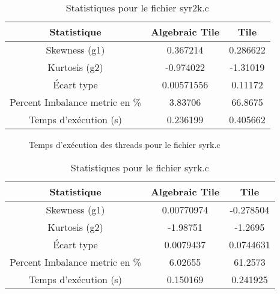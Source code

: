 \documentclass{article}
\begin{document}
\begin{table}[htbp]
  \centering
  \caption{Statistiques pour le fichier syr2k.c}
  \begin{tabular}{|c|c|c|}
    \hline
    Statistique & Algebraic Tile & Tile \\ 
    \hline
    Skewness (g1) & 0.367214 & 0.286622 \\ 
    Kurtosis (g2) & -0.974022 & -1.31019 \\ 
    Écart type & 0.00571556 & 0.11172 \\ 
    Percent Imbalance metric en \% & 3.83706 & 66.8675 \\ 
    Temps d'exécution (s) &  0.236199      &  0.405662    \\ 
    \hline
  \end{tabular}
\end{table}
\newpage

\begin{figure}
  \centering
  \caption{Temps d'exécution des threads pour le fichier syrk.c}
  \label{fig:syrk.c}
\end{figure}

\begin{table}[htbp]
  \centering
  \caption{Statistiques pour le fichier syrk.c}
  \begin{tabular}{|c|c|c|}
    \hline
    Statistique & Algebraic Tile & Tile \\ 
    \hline
    Skewness (g1) & 0.00770974 & -0.278504 \\ 
    Kurtosis (g2) & -1.98751 & -1.2695 \\ 
    Écart type & 0.0079437 & 0.0744631 \\ 
    Percent Imbalance metric en \% & 6.02655 & 61.2573 \\ 
    Temps d'exécution (s) &  0.150169      &  0.241925    \\ 
    \hline
  \end{tabular}
\end{table}
\newpage
\end{document}
